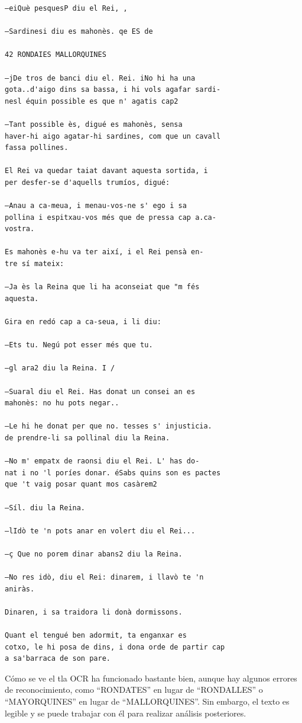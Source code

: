 \documentclass[
  letterpaper,
  DIV=11,
  numbers=noendperiod]{scrreprt}
\begin{document}
\begin{verbatim}
—eiQuè pesquesP diu el Rei, ,

—Sardinesi diu es mahonès. qe ES de

42 RONDAIES MALLORQUINES

—jDe tros de banci diu el. Rei. iNo hi ha una
gota..d'aigo dins sa bassa, i hi vols agafar sardi-
nesl équin possible es que n' agatis cap2

—Tant possible ès, digué es mahonès, sensa
haver-hi aigo agatar-hi sardines, com que un cavall
fassa pollines.

El Rei va quedar taiat davant aquesta sortida, i
per desfer-se d'aquells trumíos, digué:

—Anau a ca-meua, i menau-vos-ne s' ego i sa
pollina i espitxau-vos més que de pressa cap a.ca-
vostra.

Es mahonès e-hu va ter així, i el Rei pensà en-
tre sí mateix:

—Ja ès la Reina que li ha aconseiat que "m fés
aquesta.

Gira en redó cap a ca-seua, i li diu:

—Ets tu. Negú pot esser més que tu.

—gl ara2 diu la Reina. I /

—Suaral diu el Rei. Has donat un consei an es
mahonès: no hu pots negar..

—Le hi he donat per que no. tesses s' injusticia.
de prendre-li sa pollinal diu la Reina.

—No m' empatx de raonsi diu el Rei. L' has do-
nat i no 'l poríes donar. éSabs quins son es pactes
que 't vaig posar quant mos casàrem2

—Síl. diu la Reina.

—lIdò te 'n pots anar en volert diu el Rei...

—ç Que no porem dinar abans2 diu la Reina.

—No res idò, diu el Rei: dinarem, i llavò te 'n
aniràs.

Dinaren, i sa traidora li donà dormissons.

Quant el tengué ben adormit, ta enganxar es
cotxo, le hi posa de dins, i dona orde de partir cap
a sa'barraca de son pare.
\end{verbatim}

Cómo se ve el tla OCR ha funcionado bastante bien, aunque hay algunos
errores de reconocimiento, como ``RONDATES'' en lugar de ``RONDALLES'' o
``MAYORQUINES'' en lugar de ``MALLORQUINES''. Sin embargo, el texto es
legible y se puede trabajar con él para realizar análisis posteriores.
\end{document}
